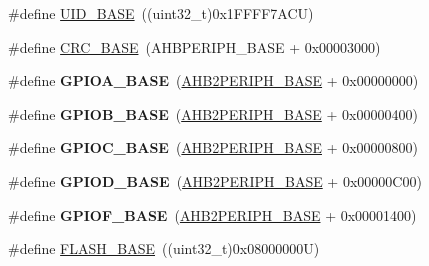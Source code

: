 \begin{DoxyCompactItemize}
\item 
\#define \hyperlink{group___peripheral__memory__map_ga664eda42b83c919b153b07b23348be67}{U\+I\+D\+\_\+\+B\+A\+SE}~((uint32\+\_\+t)0x1\+F\+F\+F\+F7\+A\+C\+U)
\item 
\#define \hyperlink{group___peripheral__memory__map_ga656a447589e785594cbf2f45c835ad7e}{C\+R\+C\+\_\+\+B\+A\+SE}~(A\+H\+B\+P\+E\+R\+I\+P\+H\+\_\+\+B\+A\+SE + 0x00003000)
\item 
\mbox{\label{group___peripheral__memory__map_gad7723846cc5db8e43a44d78cf21f6efa}} 
\#define {\bfseries G\+P\+I\+O\+A\+\_\+\+B\+A\+SE}~(\hyperlink{group___peripheral__memory__map_gaeedaa71d22a1948492365e2cd26cfd46}{A\+H\+B2\+P\+E\+R\+I\+P\+H\+\_\+\+B\+A\+SE} + 0x00000000)
\item 
\mbox{\label{group___peripheral__memory__map_gac944a89eb789000ece920c0f89cb6a68}} 
\#define {\bfseries G\+P\+I\+O\+B\+\_\+\+B\+A\+SE}~(\hyperlink{group___peripheral__memory__map_gaeedaa71d22a1948492365e2cd26cfd46}{A\+H\+B2\+P\+E\+R\+I\+P\+H\+\_\+\+B\+A\+SE} + 0x00000400)
\item 
\mbox{\label{group___peripheral__memory__map_ga26f267dc35338eef219544c51f1e6b3f}} 
\#define {\bfseries G\+P\+I\+O\+C\+\_\+\+B\+A\+SE}~(\hyperlink{group___peripheral__memory__map_gaeedaa71d22a1948492365e2cd26cfd46}{A\+H\+B2\+P\+E\+R\+I\+P\+H\+\_\+\+B\+A\+SE} + 0x00000800)
\item 
\mbox{\label{group___peripheral__memory__map_ga1a93ab27129f04064089616910c296ec}} 
\#define {\bfseries G\+P\+I\+O\+D\+\_\+\+B\+A\+SE}~(\hyperlink{group___peripheral__memory__map_gaeedaa71d22a1948492365e2cd26cfd46}{A\+H\+B2\+P\+E\+R\+I\+P\+H\+\_\+\+B\+A\+SE} + 0x00000\+C00)
\item 
\mbox{\label{group___peripheral__memory__map_ga7f9a3f4223a1a784af464a114978d26e}} 
\#define {\bfseries G\+P\+I\+O\+F\+\_\+\+B\+A\+SE}~(\hyperlink{group___peripheral__memory__map_gaeedaa71d22a1948492365e2cd26cfd46}{A\+H\+B2\+P\+E\+R\+I\+P\+H\+\_\+\+B\+A\+SE} + 0x00001400)
\item 
\#define \hyperlink{group___peripheral__memory__map_ga23a9099a5f8fc9c6e253c0eecb2be8db}{F\+L\+A\+S\+H\+\_\+\+B\+A\+SE}~((uint32\+\_\+t)0x08000000\+U)

\end{DoxyCompactItemize}
